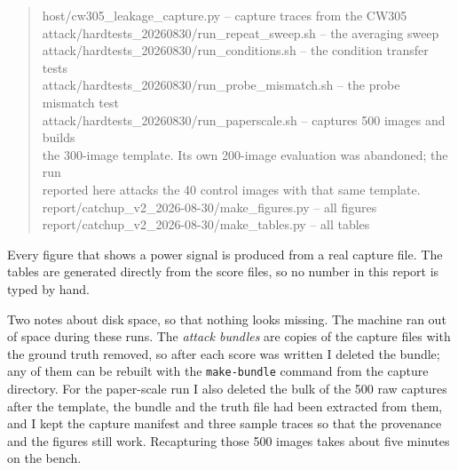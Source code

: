 \documentclass[11pt,a4paper]{article}
\begin{document}
\begin{quote}\small\ttfamily
host/cw305\_leakage\_capture.py \quad -- capture traces from the CW305\\
attack/hardtests\_20260830/run\_repeat\_sweep.sh \quad -- the averaging sweep\\
attack/hardtests\_20260830/run\_conditions.sh \quad -- the condition transfer tests\\
attack/hardtests\_20260830/run\_probe\_mismatch.sh \quad -- the probe mismatch test\\
attack/hardtests\_20260830/run\_paperscale.sh \quad -- captures 500 images and builds\\
\quad the 300-image template. Its own 200-image evaluation was abandoned; the run\\
\quad reported here attacks the 40 control images with that same template.\\
report/catchup\_v2\_2026-08-30/make\_figures.py \quad -- all figures\\
report/catchup\_v2\_2026-08-30/make\_tables.py \quad -- all tables
\end{quote}

Every figure that shows a power signal is produced from a real capture file. The tables
are generated directly from the score files, so no number in this report is typed by
hand.

Two notes about disk space, so that nothing looks missing. The machine ran out of space
during these runs. The \emph{attack bundles} are copies of the capture files with the
ground truth removed, so after each score was written I deleted the bundle; any of them
can be rebuilt with the \texttt{make-bundle} command from the capture directory. For the
paper-scale run I also deleted the bulk of the 500 raw captures after the template, the
bundle and the truth file had been extracted from them, and I kept the capture manifest
and three sample traces so that the provenance and the figures still work. Recapturing
those 500 images takes about five minutes on the bench.
\end{document}
